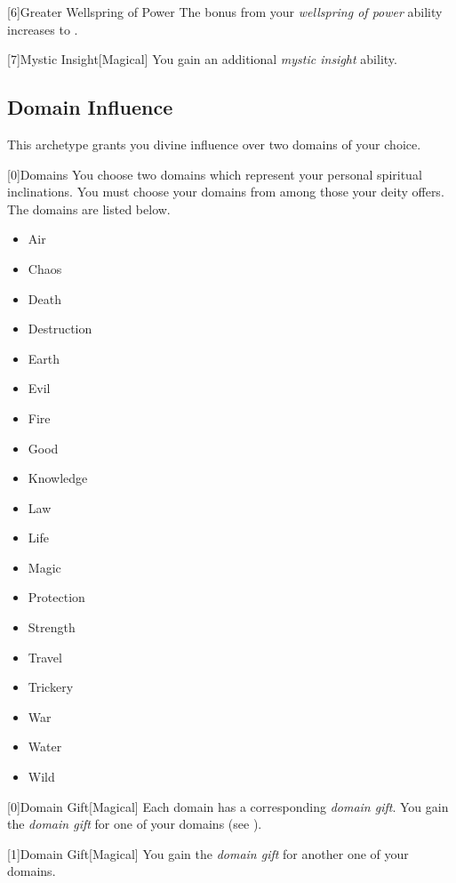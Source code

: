         [6]{Greater Wellspring of Power} The bonus from your \textit{wellspring of power} ability increases to .

        [7]{Mystic Insight}[Magical]
        You gain an additional \textit{mystic insight} ability.

    \newpage
    \subsection{Domain Influence}
        This archetype grants you divine influence over two domains of your choice.

        [0]{Domains}
        You choose two domains which represent your personal spiritual inclinations.
        You must choose your domains from among those your deity offers.
        The domains are listed below.

        \begin{itemize}
            \item{Air}
            \item{Chaos}
            \item{Death}
            \item{Destruction}
            \item{Earth}
            \item{Evil}
            \item{Fire}
            \item{Good}
            \item{Knowledge}
            \item{Law}
            \item{Life}
            \item{Magic}
            \item{Protection}
            \item{Strength}
            \item{Travel}
            \item{Trickery}
            \item{War}
            \item{Water}
            \item{Wild}
        \end{itemize}

        [0]{Domain Gift}[Magical]
        Each domain has a corresponding \textit{domain gift}.
        You gain the \textit{domain gift} for one of your domains (see ).

        [1]{Domain Gift}[Magical]
        You gain the \textit{domain gift} for another one of your domains.

